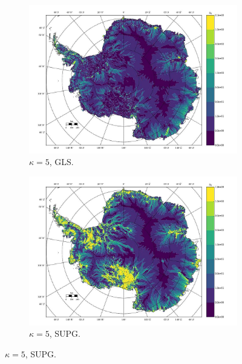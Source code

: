 \begin{figure}
  \begin{subfigure}[b]{0.45\linewidth}
    \includegraphics[width=\linewidth]{images/balance_velocity/antarctica/Ubar_10H_kappa_5_GLS.jpg}
  \caption{$\kappa = 5$, GLS.}
  \label{antarctica_bv_image_kappa_5_GLS}
  \end{subfigure}
  \begin{subfigure}[b]{0.45\linewidth}
    \includegraphics[width=\linewidth]{images/balance_velocity/antarctica/Ubar_10H_kappa_5_SUPG.jpg}
  \caption{$\kappa = 5$, SUPG.}
  \label{antarctica_bv_image_kappa_5_SUPG}
  \end{subfigure}


\end{figure}
